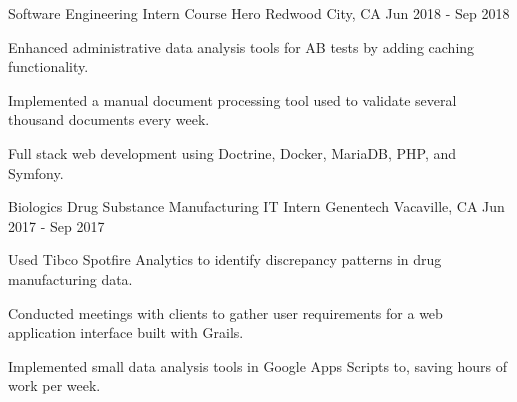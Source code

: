 

\begin{cventries}

  \cventry
  {Software Engineering Intern}
  {Course Hero}
  {Redwood City, CA}
  {Jun 2018 - Sep 2018}
  {
  \begin{cvitems}
    \item {Enhanced administrative data analysis tools for AB tests by adding caching functionality.}
    \item {Implemented a manual document processing tool used to validate several thousand documents every week.}
    \item {Full stack web development using Doctrine, Docker, MariaDB, PHP, and Symfony.}
  \end{cvitems}
  }

  \cventry
  {Biologics Drug Substance Manufacturing IT Intern} %
  {Genentech} %
  {Vacaville, CA} %
  {Jun 2017 - Sep 2017} %
  {
  \begin{cvitems} %
    \item {Used Tibco Spotfire Analytics to identify discrepancy patterns in drug manufacturing data.}
    \item {Conducted meetings with clients to gather user requirements for a web application interface built with Grails.}
    \item {Implemented small data analysis tools in Google Apps Scripts to, saving hours of work per week.}
  \end{cvitems}
  }
\end{cventries}
